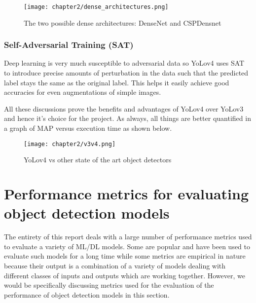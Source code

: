 \begin{figure}[h]
  \centering
    \texttt{[image: chapter2/dense\_architectures.png]}
  \caption{The two possible dense architectures: DenseNet and CSPDensnet}
  \label{fig:dense_arch}
\end{figure}

\subsubsection{Self-Adversarial Training (SAT)}
Deep learning is very much susceptible to adversarial data so YoLov4 uses SAT to introduce precise amounts of perturbation in the data such that the predicted label stays the same as the original label. This helps it easily achieve good accuracies for even augmentations of simple images.

All these discussions prove the benefits and advantages of YoLov4 over YoLov3 and hence it's choice for the project. As always, all things are better quantified in a graph of MAP versus execution time as shown below.

\begin{figure}[h]
  \centering
  \texttt{[image: chapter2/v3v4.png]}
  \caption{YoLov4 vs other state of the art object detectors}
  \label{fig:v3_vs_v4}
\end{figure}


\section{Performance metrics for evaluating object detection models}

The entirety of this report deals with a large number of performance metrics used to evaluate a variety of ML/DL models. Some are popular and have been used to evaluate such models for a long time while some metrics are empirical in nature because their output is a combination of a variety of models dealing with different classes of inputs and outputs which are working together. However, we would be specifically discussing metrics used for the evaluation of the performance of object detection models in this section.
